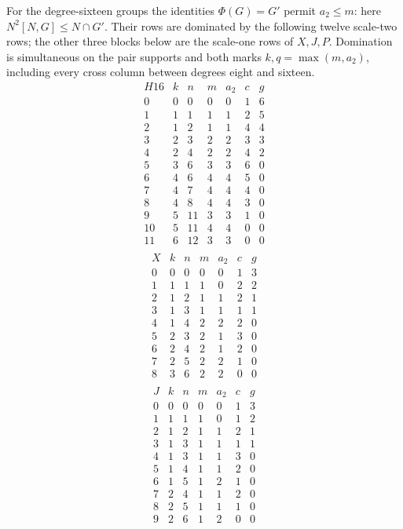 For the degree-sixteen groups the identities $\Phi(G)=G'$ permit
$a_2\leq m$: here $N^2[N,G]\leq N\cap G'$. Their rows are dominated
by the following twelve scale-two rows; the other three blocks below
are the scale-one rows of $X,J,P$. Domination is simultaneous on the
pair supports and both marks $k,q=\max(m,a_2)$, including every cross
column between degrees eight and sixteen.
\[
\begin{array}{c|rrrrrr}
H16&k&n&m&a_2&c&g\\\hline
0&0&0&0&0&1&6\\
1&1&1&1&1&2&5\\
2&1&2&1&1&4&4\\
3&2&3&2&2&3&3\\
4&2&4&2&2&4&2\\
5&3&6&3&3&6&0\\
6&4&6&4&4&5&0\\
7&4&7&4&4&4&0\\
8&4&8&4&4&3&0\\
9&5&11&3&3&1&0\\
10&5&11&4&4&0&0\\
11&6&12&3&3&0&0\\
\end{array}
\]
\[
\begin{array}{c|rrrrrr}
X&k&n&m&a_2&c&g\\\hline
0&0&0&0&0&1&3\\
1&1&1&1&0&2&2\\
2&1&2&1&1&2&1\\
3&1&3&1&1&1&1\\
4&1&4&2&2&2&0\\
5&2&3&2&1&3&0\\
6&2&4&2&1&2&0\\
7&2&5&2&2&1&0\\
8&3&6&2&2&0&0\\
\end{array}
\]
\[
\begin{array}{c|rrrrrr}
J&k&n&m&a_2&c&g\\\hline
0&0&0&0&0&1&3\\
1&1&1&1&0&1&2\\
2&1&2&1&1&2&1\\
3&1&3&1&1&1&1\\
4&1&3&1&1&3&0\\
5&1&4&1&1&2&0\\
6&1&5&1&2&1&0\\
7&2&4&1&1&2&0\\
8&2&5&1&1&1&0\\
9&2&6&1&2&0&0\\
\end{array}
\]

